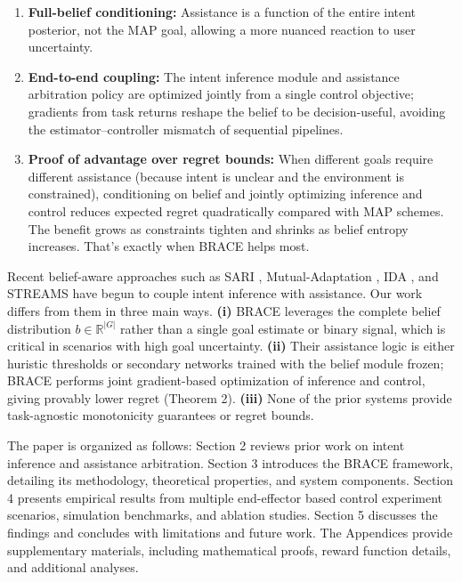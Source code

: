 \documentclass[11pt]{article}
\begin{document}
\begin{enumerate}[leftmargin=*]
\item  
      \textbf{Full-belief conditioning:} Assistance is a function of the entire intent posterior, not the MAP goal, allowing a more nuanced reaction to user uncertainty. 

\item   
      \textbf{End-to-end coupling:} The intent inference module and assistance arbitration policy are optimized jointly from a single control objective; gradients from task returns reshape the belief to be decision-useful, avoiding the estimator–controller mismatch of sequential pipelines. 

\item  
      \textbf{Proof of advantage over regret bounds:} When different goals require different assistance (because intent is unclear and the environment is constrained), conditioning on belief and jointly optimizing inference and control reduces expected regret quadratically compared with MAP schemes. The benefit grows as constraints tighten and shrinks as belief entropy increases. That’s exactly when BRACE helps most.
\end{enumerate}
  
Recent belief-aware approaches such as SARI \cite{jonnavittula2022}, Mutual-Adaptation \cite{nikolaidis}, IDA \cite{IDA}, and STREAMS \cite{streams} have begun to couple intent inference with assistance. Our work differs from them in three main ways. \textbf{(i)} BRACE leverages the complete belief distribution $b\in\mathbb{R}^{|G|}$ rather than a single goal estimate or binary signal, which is critical in scenarios with high goal uncertainty. \textbf{(ii)} Their assistance logic is either huristic thresholds or secondary networks trained with the belief module frozen; BRACE performs joint gradient-based optimization of inference and control, giving provably lower regret (Theorem 2). \textbf{(iii)} None of the prior systems provide task-agnostic monotonicity guarantees or regret bounds.

The paper is organized as follows: Section 2 reviews prior work on intent inference and assistance arbitration. Section 3 introduces the BRACE framework, detailing its methodology, theoretical properties, and system components. Section 4 presents empirical results from multiple end-effector based control experiment scenarios, simulation benchmarks, and ablation studies. Section 5 discusses the findings and concludes with limitations and future work. The Appendices provide supplementary materials, including mathematical proofs, reward function details, and additional analyses.
\end{document}
